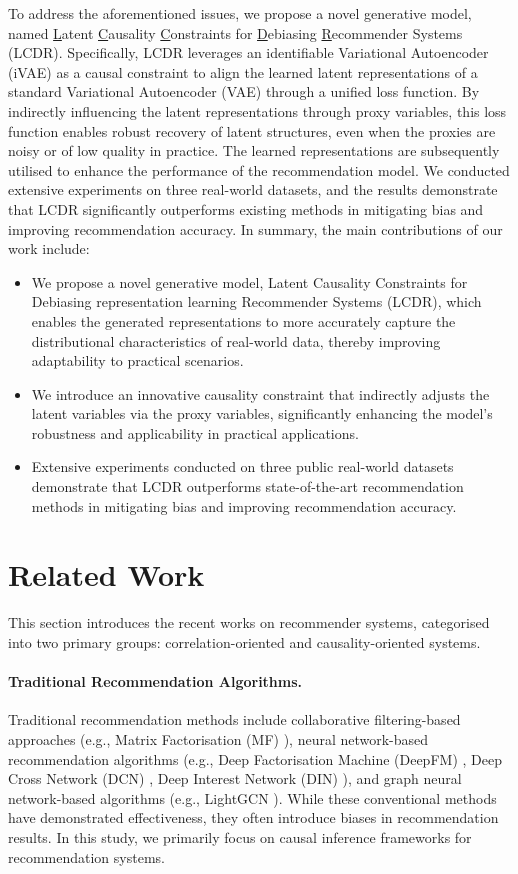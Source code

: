 \documentclass[sigconf]{acmart}
\begin{document}
To address the aforementioned issues, we propose a novel generative model, named \underline{L}atent \underline{C}ausality \underline{C}onstraints for \underline{D}ebiasing \underline{R}ecommender Systems (LCDR). Specifically, LCDR leverages an identifiable Variational Autoencoder (iVAE) as a causal constraint to align the learned latent representations of a standard Variational Autoencoder (VAE) through a unified loss function. 
By indirectly influencing the latent representations through proxy variables, this loss function enables robust recovery of latent structures, even when the proxies are noisy or of low quality in practice. The learned representations are subsequently utilised to enhance the performance of the recommendation model. We conducted extensive experiments on three real-world datasets, and the results demonstrate that LCDR significantly outperforms existing methods in mitigating bias and improving recommendation accuracy.
In summary, the main contributions of our work include:
\begin{itemize}
    \item We propose a novel generative model, Latent Causality Constraints for Debiasing representation learning Recommender Systems (LCDR), which enables the generated representations to more accurately capture the distributional characteristics of real-world data, thereby improving adaptability to practical scenarios.
    \item We introduce an innovative causality constraint that indirectly adjusts the latent variables via the proxy variables, significantly enhancing the model’s robustness and applicability in practical applications.
    \item Extensive experiments conducted on three public real-world datasets demonstrate that LCDR outperforms state-of-the-art recommendation methods in mitigating bias and improving recommendation accuracy.
\end{itemize} 
 

\section{Related Work}
This section introduces the recent works on recommender systems, categorised into two primary groups: correlation-oriented and causality-oriented systems.

\paragraph{Traditional Recommendation Algorithms.}
Traditional recommendation methods include collaborative filtering-based approaches (e.g., Matrix Factorisation (MF) \cite{12}), neural network-based recommendation algorithms (e.g., Deep Factorisation Machine (DeepFM) \cite{deepfm}, Deep Cross Network (DCN) \cite{dcn}, Deep Interest Network (DIN) \cite{din}), and graph neural network-based algorithms (e.g., LightGCN \cite{lightgcn}). While these conventional methods have demonstrated effectiveness, they often introduce biases in recommendation results. In this study, we primarily focus on causal inference frameworks for recommendation systems.
\end{document}
